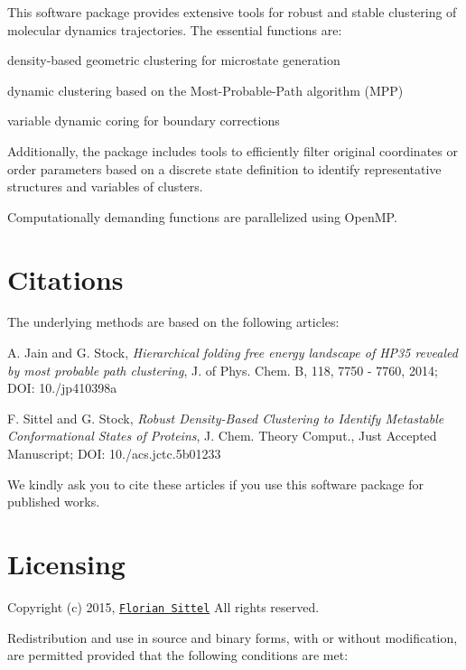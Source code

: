 This software package provides extensive tools for robust and stable clustering of molecular dynamics trajectories. The essential functions are\-:
\begin{DoxyItemize}
\item density-\/based geometric clustering for microstate generation
\item dynamic clustering based on the Most-\/\-Probable-\/\-Path algorithm (M\-P\-P)
\item variable dynamic coring for boundary corrections
\end{DoxyItemize}

Additionally, the package includes tools to efficiently filter original coordinates or order parameters based on a discrete state definition to identify representative structures and variables of clusters.

Computationally demanding functions are parallelized using Open\-M\-P.

\section*{Citations}

The underlying methods are based on the following articles\-:
\begin{DoxyItemize}
\item A. Jain and G. Stock, {\itshape Hierarchical folding free energy landscape of H\-P35 revealed by most probable path clustering}, J. of Phys. Chem. B, 118, 7750 -\/ 7760, 2014; D\-O\-I\-: 10./jp410398a
\item F. Sittel and G. Stock, {\itshape Robust Density-\/\-Based Clustering to Identify Metastable Conformational States of Proteins}, J. Chem. Theory Comput., Just Accepted Manuscript; D\-O\-I\-: 10./acs.jctc.\-5b01233
\end{DoxyItemize}

We kindly ask you to cite these articles if you use this software package for published works.

\section*{Licensing}

Copyright (c) 2015, \href{http://www.lettis.net}{\tt Florian Sittel} All rights reserved.

Redistribution and use in source and binary forms, with or without modification, are permitted provided that the following conditions are met\-:


